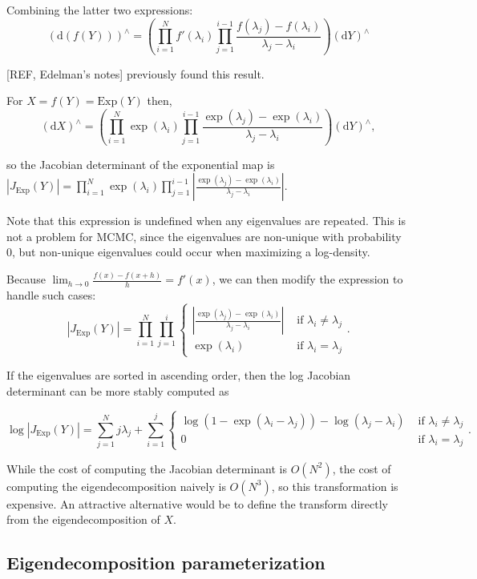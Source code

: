 \documentclass[11pt]{article}
\newcommand{\abs}[1]{\left| #1 \right|}
\newcommand{\absdet}[1]{\abs{#1}}
\newcommand{\dv}[1]{\mathrm{d}{#1}}
\newcommand{\Exp}{\mathrm{Exp}}
\begin{document}
Combining the latter two expressions:
\[(\dv{(f(Y))})^\wedge = \left(\prod_{i=1}^N f'(\lambda_i) \prod_{j=1}^{i-1} \frac{f(\lambda_j) - f(\lambda_i)}{\lambda_j - \lambda_i}\right) (\dv{Y})^\wedge\]

[REF, Edelman's notes] previously found this result.

For $X = f(Y) = \Exp(Y)$ then,
\[ (\dv{X})^\wedge = \left(\prod_{i=1}^N \exp(\lambda_i) \prod_{j=1}^{i-1} \frac{\exp(\lambda_j) - \exp(\lambda_i)}{\lambda_j - \lambda_i}\right) (\dv{Y})^\wedge,\]

so the Jacobian determinant of the exponential map is $\absdet{J_{\Exp}(Y)} = \prod_{i=1}^N \exp(\lambda_i) \prod_{j=1}^{i-1} \left|\frac{\exp(\lambda_j) - \exp(\lambda_i)}{\lambda_j - \lambda_i}\right|$.

Note that this expression is undefined when any eigenvalues are repeated.
This is not a problem for MCMC, since the eigenvalues are non-unique with probability 0, but non-unique eigenvalues could occur when maximizing a log-density.

Because $\lim_{h \to 0} \frac{f(x) - f(x + h)}{h} = f'(x)$, we can then modify the expression to handle such cases:
\[
  \absdet{J_{\Exp}(Y)} = \prod_{i=1}^N \prod_{j=1}^i \begin{cases}
    \left|\frac{\exp(\lambda_j) - \exp(\lambda_i)}{\lambda_j - \lambda_i}\right| &\text{ if } \lambda_i \ne \lambda_j \\ 
    \exp(\lambda_i) &\text{ if } \lambda_i = \lambda_j
  \end{cases}.
\]

If the eigenvalues are sorted in ascending order, then the log Jacobian determinant can be more stably computed as 

\[
  \log\absdet{J_{\Exp}(Y)} = \sum_{j=1}^N j\lambda_j + \sum_{i=1}^j \begin{cases}
    \log(1 - \exp(\lambda_i - \lambda_j)) - \log(\lambda_j - \lambda_i) &\text{ if } \lambda_i \ne \lambda_j \\ 
    0 &\text{ if } \lambda_i = \lambda_j
  \end{cases}.
\]

While the cost of computing the Jacobian determinant is $O(N^2)$, the cost of computing the eigendecomposition naively is $O(N^3)$, so this transformation is expensive.
An attractive alternative would be to define the transform directly from the eigendecomposition of $X$.

\subsection{Eigendecomposition parameterization}
\end{document}
